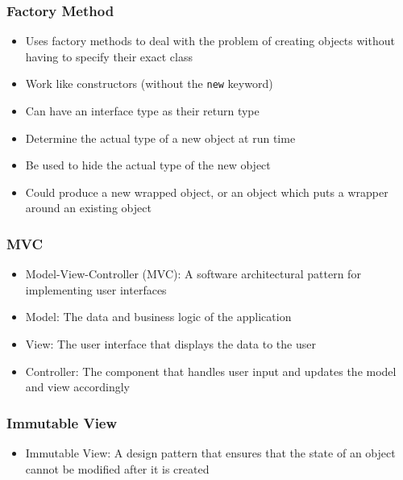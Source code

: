 \documentclass[12pt,openany]{book}
\begin{document}
\subsubsection{Factory Method}
\begin{itemize}
    \item Uses factory methods to deal with the problem of creating objects without having to specify their exact class
    \item Work like constructors (without the \texttt{new} keyword)
    \item Can have an interface type as their return type
    \item Determine the actual type of a new object at run time
    \item Be used to hide the actual type of the new object
    \item Could produce a new wrapped object, or an object which puts a wrapper around an existing object
\end{itemize}
\subsubsection{MVC}
\begin{itemize}
    \item Model-View-Controller (MVC): A software architectural pattern for implementing user interfaces
    \item Model: The data and business logic of the application
    \item View: The user interface that displays the data to the user
    \item Controller: The component that handles user input and updates the model and view accordingly
\end{itemize}
\subsubsection{Immutable View}
\begin{itemize}
    \item Immutable View: A design pattern that ensures that the state of an object cannot be modified after it is created
\end{itemize}
\end{document}
